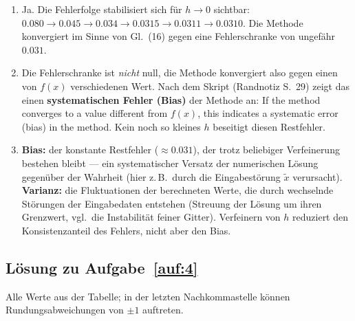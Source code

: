 \documentclass[a4paper,11pt]{scrartcl}
\begin{document}
\begin{enumerate}[label=(\alph*)]
  \item Ja. Die Fehlerfolge stabilisiert sich für $h \to 0$ sichtbar: $0.080 \to 0.045 \to 0.034 \to 0.0315 \to 0.0311 \to 0.0310$. Die Methode konvergiert im Sinne von Gl.~(16) gegen eine Fehlerschranke von ungefähr $0.031$.
  \item Die Fehlerschranke ist \emph{nicht} null, die Methode konvergiert also gegen einen von $f(x)$ verschiedenen Wert. Nach dem Skript (Randnotiz S.~29) zeigt das einen \textbf{systematischen Fehler (Bias)} der Methode an: \glqq If the method converges to a value different from $f(x)$, this indicates a systematic error (bias) in the method.\grqq{} Kein noch so kleines $h$ beseitigt diesen Restfehler.
  \item \textbf{Bias:} der konstante Restfehler ($\approx 0.031$), der trotz beliebiger Verfeinerung bestehen bleibt --- ein systematischer Versatz der numerischen Lösung gegenüber der Wahrheit (hier z.\,B.\ durch die Eingabestörung $\tilde{x}$ verursacht). \textbf{Varianz:} die Fluktuationen der berechneten Werte, die durch wechselnde Störungen der Eingabedaten entstehen (Streuung der Lösung um ihren Grenzwert, vgl.\ die Instabilität feiner Gitter). Verfeinern von $h$ reduziert den Konsistenzanteil des Fehlers, nicht aber den Bias.
\end{enumerate}

\subsection*{Lösung zu Aufgabe~\ref{auf:4}}

Alle Werte aus der Tabelle; in der letzten Nachkommastelle können Rundungsabweichungen von $\pm 1$ auftreten.
\end{document}
